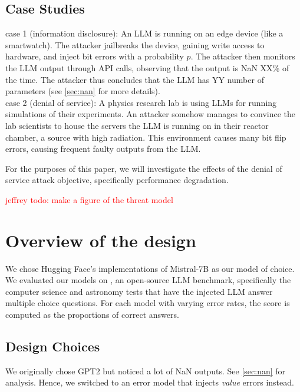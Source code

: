 \subsection{Case Studies}
case 1 (information disclosure): An LLM is running on an edge device (like a smartwatch). The attacker jailbreaks the device, gaining write access to hardware, and inject bit errors with a probability $p$. The attacker then monitors the LLM output through API calls, observing that the output is NaN XX\% of the time. The attacker thus concludes that the LLM has YY number of parameters (see \ref{sec:nan} for more details). \\

case 2 (denial of service): A physics research lab is using LLMs for running simulations of their experiments. An attacker somehow manages to convince the lab scientists to house the servers the LLM is running on in their reactor chamber, a source with high radiation. This environment causes many bit flip errors, causing frequent faulty outputs from the LLM.

For the purposes of this paper, we will investigate the effects of the denial of service attack objective, specifically performance degradation.


\textcolor{red}{jeffrey todo: make a figure of the threat model}



\section{Overview of the design}
\label{sec:overview}

We chose Hugging Face's implementations of Mistral-7B \cite{jiang2023mistral7b} as our model of choice. We evaluated our models on \cite{hendrycks2021measuringmassivemultitasklanguage}, an open-source LLM benchmark, specifically the computer science and astronomy tests that have the injected LLM answer multiple choice questions. For each model with varying error rates, the score is computed as the proportions of correct answers.

\subsection{Design Choices}
We originally chose GPT2 but noticed a lot of NaN outputs. See \ref{sec:nan} for analysis. Hence, we switched to an error model that injects \textit{value} errors instead. \\

